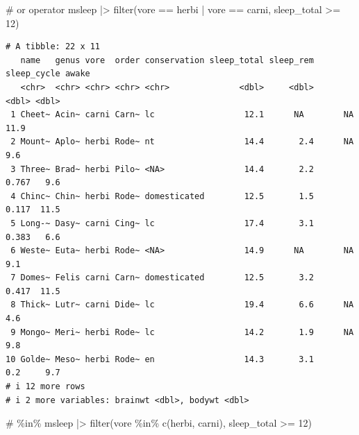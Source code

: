 \documentclass[
  letterpaper,
  DIV=11,
  numbers=noendperiod]{scrreprt}
\newenvironment{Shaded}{\begin{snugshade}}{\end{snugshade}}
\newcommand{\CommentTok}[1]{\textcolor[rgb]{0.37,0.37,0.37}{#1}}
\newcommand{\DecValTok}[1]{\textcolor[rgb]{0.68,0.00,0.00}{#1}}
\newcommand{\FunctionTok}[1]{\textcolor[rgb]{0.28,0.35,0.67}{#1}}
\newcommand{\NormalTok}[1]{\textcolor[rgb]{0.00,0.23,0.31}{#1}}
\newcommand{\SpecialCharTok}[1]{\textcolor[rgb]{0.37,0.37,0.37}{#1}}
\newcommand{\StringTok}[1]{\textcolor[rgb]{0.13,0.47,0.30}{#1}}
\begin{document}
\begin{tcolorbox}[enhanced jigsaw, colbacktitle=quarto-callout-tip-color!10!white, opacitybacktitle=0.6, breakable, left=2mm, leftrule=.75mm, toprule=.15mm, toptitle=1mm, bottomtitle=1mm, colframe=quarto-callout-tip-color-frame, opacityback=0, coltitle=black, arc=.35mm, titlerule=0mm, colback=white, bottomrule=.15mm, title=\textcolor{quarto-callout-tip-color}{\faLightbulb}\hspace{0.5em}{Answer}, rightrule=.15mm]

\begin{Shaded}
\begin{Highlighting}[]
\CommentTok{\# \textquotesingle{}or\textquotesingle{} operator}
\NormalTok{msleep }\SpecialCharTok{|\textgreater{}}
  \FunctionTok{filter}\NormalTok{(vore }\SpecialCharTok{==} \StringTok{\textquotesingle{}herbi\textquotesingle{}} \SpecialCharTok{|}\NormalTok{ vore }\SpecialCharTok{==} \StringTok{\textquotesingle{}carni\textquotesingle{}}\NormalTok{, sleep\_total }\SpecialCharTok{\textgreater{}=} \DecValTok{12}\NormalTok{)}
\end{Highlighting}
\end{Shaded}

\begin{verbatim}
# A tibble: 22 x 11
   name   genus vore  order conservation sleep_total sleep_rem sleep_cycle awake
   <chr>  <chr> <chr> <chr> <chr>              <dbl>     <dbl>       <dbl> <dbl>
 1 Cheet~ Acin~ carni Carn~ lc                  12.1      NA        NA      11.9
 2 Mount~ Aplo~ herbi Rode~ nt                  14.4       2.4      NA       9.6
 3 Three~ Brad~ herbi Pilo~ <NA>                14.4       2.2       0.767   9.6
 4 Chinc~ Chin~ herbi Rode~ domesticated        12.5       1.5       0.117  11.5
 5 Long-~ Dasy~ carni Cing~ lc                  17.4       3.1       0.383   6.6
 6 Weste~ Euta~ herbi Rode~ <NA>                14.9      NA        NA       9.1
 7 Domes~ Felis carni Carn~ domesticated        12.5       3.2       0.417  11.5
 8 Thick~ Lutr~ carni Dide~ lc                  19.4       6.6      NA       4.6
 9 Mongo~ Meri~ herbi Rode~ lc                  14.2       1.9      NA       9.8
10 Golde~ Meso~ herbi Rode~ en                  14.3       3.1       0.2     9.7
# i 12 more rows
# i 2 more variables: brainwt <dbl>, bodywt <dbl>
\end{verbatim}

\begin{Shaded}
\begin{Highlighting}[]
\CommentTok{\# \%in\%}
\NormalTok{msleep }\SpecialCharTok{|\textgreater{}}
  \FunctionTok{filter}\NormalTok{(vore }\SpecialCharTok{\%in\%} \FunctionTok{c}\NormalTok{(}\StringTok{\textquotesingle{}herbi\textquotesingle{}}\NormalTok{, }\StringTok{\textquotesingle{}carni\textquotesingle{}}\NormalTok{), sleep\_total }\SpecialCharTok{\textgreater{}=} \DecValTok{12}\NormalTok{)}
\end{Highlighting}
\end{Shaded}


\end{tcolorbox}
\end{document}
